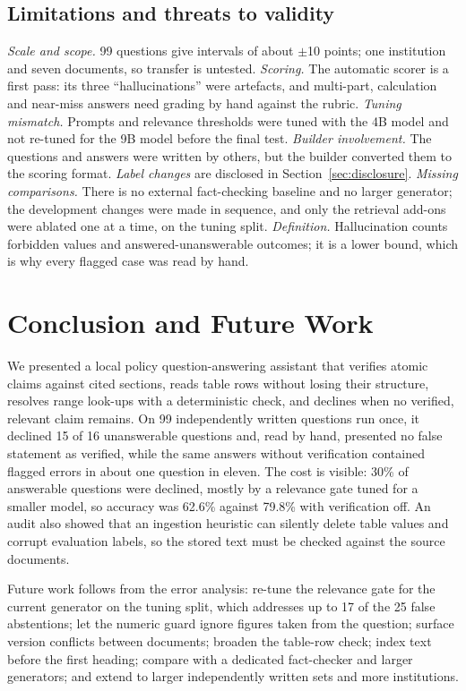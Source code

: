 \documentclass[conference]{IEEEtran}
\begin{document}
\subsection{Limitations and threats to validity}
\textit{Scale and scope.} 99 questions give intervals of about $\pm$10 points; one institution and seven
documents, so transfer is untested. \textit{Scoring.} The automatic scorer is a first pass: its three
``hallucinations'' were artefacts, and multi-part, calculation and near-miss answers need grading by hand
against the rubric. \textit{Tuning mismatch.} Prompts and relevance thresholds were tuned with the 4B model
and not re-tuned for the 9B model before the final test. \textit{Builder involvement.} The questions and
answers were written by others, but the builder converted them to the scoring format. \textit{Label
changes} are disclosed in Section~\ref{sec:disclosure}. \textit{Missing comparisons.} There is no external
fact-checking baseline and no larger generator; the development changes were made in sequence, and only the
retrieval add-ons were ablated one at a time, on the tuning split. \textit{Definition.} Hallucination counts
forbidden values and answered-unanswerable outcomes; it is a lower bound, which is why every flagged case
was read by hand.

\section{Conclusion and Future Work}
We presented a local policy question-answering assistant that verifies atomic claims against cited
sections, reads table rows without losing their structure, resolves range look-ups with a deterministic
check, and declines when no verified, relevant claim remains. On 99 independently written questions run
once, it declined 15 of 16 unanswerable questions and, read by hand, presented no false statement as
verified, while the same answers without verification contained flagged errors in about one question in
eleven. The cost is visible: 30\% of answerable questions were declined, mostly by a relevance gate tuned
for a smaller model, so accuracy was 62.6\% against 79.8\% with verification off. An audit also showed that
an ingestion heuristic can silently delete table values and corrupt evaluation labels, so the stored text
must be checked against the source documents.

Future work follows from the error analysis: re-tune the relevance gate for the current generator on the
tuning split, which addresses up to 17 of the 25 false abstentions; let the numeric guard ignore figures
taken from the question; surface version conflicts between documents; broaden the table-row check; index
text before the first heading; compare with a dedicated fact-checker \cite{tang2024minicheck} and larger
generators; and extend to larger independently written sets \cite{ribeiro2020checklist} and more
institutions.
\end{document}
